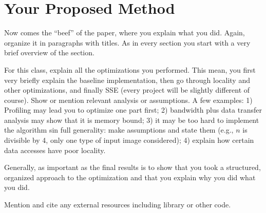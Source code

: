 \section{Your Proposed Method}\label{sec:yourmethod}

Now comes the ``beef'' of the paper, where you explain what you
did. Again, organize it in paragraphs with titles. As in every section
you start with a very brief overview of the section.

For this class, explain all the optimizations you performed. This mean, you first very briefly
explain the baseline implementation, then go through locality and other optimizations, and finally SSE (every project will be slightly different of course). Show or mention relevant analysis or assumptions. A few examples: 1) Profiling may lead you to optimize one part first; 2) bandwidth plus data transfer analysis may show that it is memory bound; 3) it may be too hard to implement the algorithm sin full generality: make assumptions and state them (e.g., $n$ is divisible by 4, only one type of input image considered); 4) explain how certain data accesses have poor locality.

Generally, as important as the final results is to show that you took a structured, organized approach to the optimization and that you explain why you did what you did.

Mention and cite any external resources including library or other code.
